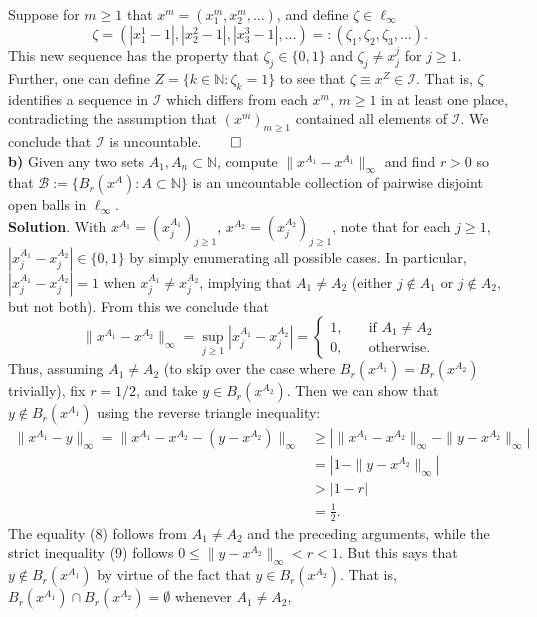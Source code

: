 \documentclass[10pt]{article}
\newcommand{\mbb}[1]{\mathbb{#1}}
\newcommand{\1}[1]{\mathbbm{1}_{#1}}
\newcommand{\mc}[1]{\mathcal{#1}}
\begin{document}
    Suppose for $m\geq 1$ that $x^m=(x^m_1,x^m_2,\dots)$, and define $\zeta\in\ell_\infty$
    \[\zeta=(|x^1_1-1|,|x^2_2-1|,|x^3_3-1|,\dots)=:(\zeta_1,\zeta_2,\zeta_3,\dots).\]
    This new sequence has the property that $\zeta_j\in\{0,1\}$ and $\zeta_j\neq x^j_j$ for $j\geq 1$. Further, one can define $Z=\{k\in\mbb{N}:\zeta_k=1\}$
    to see that $\zeta\equiv x^Z\in\mc{I}$. That is, $\zeta$ identifies a sequence in $\mc{I}$ which differs from each $x^m$, $m\geq 1$ in at least one place, contradicting
    the assumption that $(x^m)_{m\geq 1}$ contained all elements of $\mc{I}$. We conclude that $\mc{I}$ is uncountable.\hfill{$\qed$}\\[5pt]
    {\bf b)} Given any two sets $A_1,A_n\subset\mbb{N}$, compute $\|x^{A_1}-x^{A_1}\|_{\infty}$ and find $r>0$ so that $\mc{B}:=\{B_r(x^A):A\subset\mbb{N}\}$
    is an uncountable collection of pairwise disjoint open balls in $\ell_\infty$.\\[5pt]
    {\bf Solution}. With $x^{A_1}=(x^{A_1}_j)_{j\geq 1}$, $x^{A_2}=(x^{A_2}_j)_{j\geq 1}$, note that for each $j\geq 1$, $|x^{A_1}_j-x^{A_2}_j|\in\{0,1\}$ by simply enumerating all
    possible cases. In particular, $|x^{A_1}_j-x^{A_2}_j|=1$ when $x^{A_1}_j\neq x^{A_2}_j$, implying that $A_1\neq A_2$ (either $j\notin A_1$ or $j\notin A_2$, but not both).
    From this we conclude that
    \[\|x^{A_1}-x^{A_2}\|_\infty=\sup_{j\geq1}|x^{A_1}_j-x^{A_2}_j|=\begin{cases}
        1,\quad&\text{if $A_1\neq A_2$}\\
        0,\quad&\text{otherwise.}
    \end{cases}\]
    Thus, assuming $A_1\neq A_2$ (to skip over the case where $B_r(x^{A_1})=B_r(x^{A_2})$ trivially), fix $r=1/2$, and take $y\in B_r(x^{A_2})$. Then we can show that $y\notin B_r(x^{A_1})$ using
    the reverse triangle inequality:
    \begin{align*}
        \|x^{A_1}-y\|_\infty=\|x^{A_1}-x^{A_2}-(y-x^{A_2})\|_\infty&\geq\left|\|x^{A_1}-x^{A_2}\|_\infty-\|y-x^{A_2}\|_\infty\right|\\
        &=\left|1-\|y-x^{A_2}\|_\infty\right|\tag{8}\\
        &>|1-r|\tag{9}\\
        &=\frac{1}{2}.
    \end{align*}
    The equality (8) follows from $A_1\neq A_2$ and the preceding arguments, while the strict inequality (9) follows $0\leq\|y-x^{A_2}\|_\infty<r<1$.
    But this says that $y\notin B_r(x^{A_1})$ by virtue of the fact that $y\in B_r(x^{A_2})$. That is, $B_r(x^{A_1})\cap B_r(x^{A_2})=\emptyset$ whenever $A_1\neq A_2$, 
\end{document}
